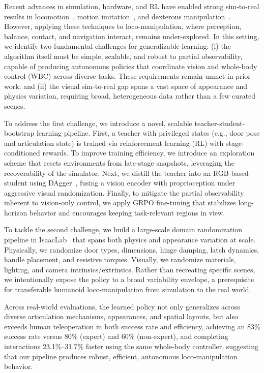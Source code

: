 Recent advances in simulation, hardware, and RL have enabled strong sim-to-real results in locomotion~\citep{zhuang2024humanoid,wang2025beamdojo,long2025learning,ren2025vb,xue2025leverb, ben2025homie}, motion imitation~\citep{liao2025beyondmimic,luo2025sonic,he2025asap}, and dexterous manipulation~\citep{singh2024dextrah,deng2025graspvla,liu2024visual,akkaya2019solving,handa2023dextreme}. However, applying these techniques to loco-manipulation, where perception, balance, contact, and navigation interact, remains under-explored. In this setting, we identify two fundamental challenges for generalizable learning: (i) the algorithm itself must be simple, scalable, and robust to partial observability, capable of producing autonomous policies that coordinate vision and whole-body control (WBC) across diverse tasks. These requirements remain unmet in prior work; and (ii) the visual sim-to-real gap spans a vast space of appearance and physics variation, requiring broad, heterogeneous data rather than a few curated scenes.

To address the first challenge, we introduce a novel, scalable teacher-student-bootstrap learning pipeline. First, a teacher with privileged states (e.g., door pose and articulation state) is trained via reinforcement learning (RL) with stage-conditioned rewards. To improve training efficiency, we introduce an exploration scheme that resets environments from late-stage snapshots, leveraging the recoverability of the simulator. Next, we distill the teacher into an RGB-based student using DAgger~\citep{ross2011dagger}, fusing a vision encoder with proprioception under aggressive visual randomization. Finally, to mitigate the partial observability inherent to vision-only control, we apply GRPO fine-tuning that stabilizes long-horizon behavior and encourages keeping task-relevant regions in view.


To tackle the second challenge, we build a large-scale domain randomization pipeline in IsaacLab~\citep{isaaclab2025} that spans both physics and appearance variation at scale. Physically, we randomize door types, dimensions, hinge damping, latch dynamics, handle placement, and resistive torques. Visually, we randomize materials, lighting, and camera intrinsics/extrinsics. Rather than recreating specific scenes, we intentionally expose the policy to a broad variability envelope, a prerequisite for transferable humanoid loco-manipulation from simulation to the real world.


Across real-world evaluations, the learned policy not only generalizes across diverse articulation mechanisms, appearances, and spatial layouts, but also exceeds human teleoperation in both success rate and efficiency, achieving an 83\% success rate versus 80\% (expert) and 60\% (non-expert), and completing interactions 23.1\%–31.7\% faster using the same whole-body controller, suggesting that our pipeline produces robust, efficient, autonomous loco-manipulation behavior.

